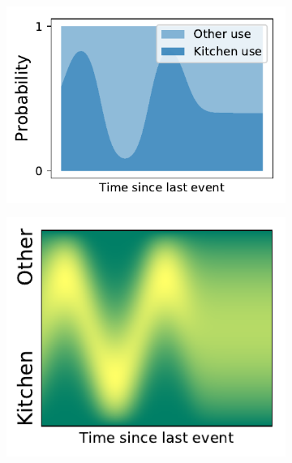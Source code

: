 \begin{figure}
        \vspace{-0.5cm}
        \centering
        \begin{subfigure}{.5 \linewidth}
                \centering
                \includegraphics[width=\linewidth]{images/categorical_evolution2.pdf}
                \vspace*{-0.6cm}
                \caption{}
                \label{fig:kitchen_categorical}
        \end{subfigure}
        \begin{subfigure}{.4 \linewidth}
                \centering
                \includegraphics[width=\linewidth]{images/dirichlet_evolution.pdf}

\end{subfigure}
\end{figure}
